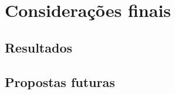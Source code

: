 \chapter{Considerações finais}
\label{consideracoes-finais}


\section{Resultados}
\label{results}

\section{Propostas futuras}
